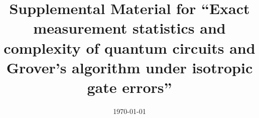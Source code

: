 \documentclass[aps,pra,onecolumn,superscriptaddress,10pt,floatfix]{revtex4-2}
\begin{document}
\title{Supplemental Material for ``Exact measurement statistics and complexity of quantum circuits and Grover's algorithm under isotropic gate errors''}

\date{\today}
\maketitle



\end{document}
